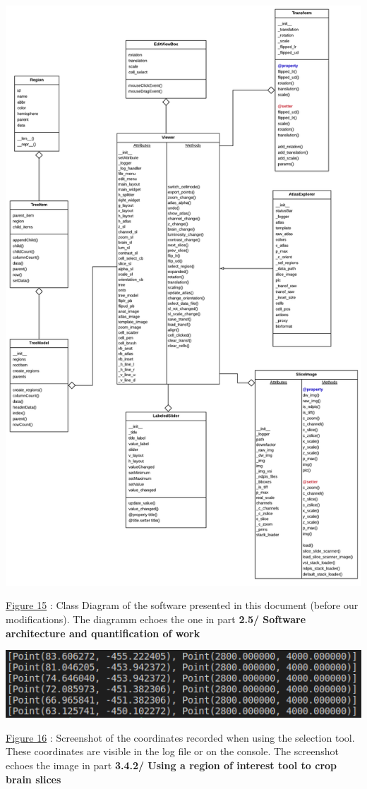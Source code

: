 \documentclass[a4paper,12pt]{report}
\begin{document}
\begin{center} \includegraphics[scale=0.4]{oldArchitecture.png}

\underline{Figure 15} : Class Diagram of the software presented in this document (before our modifications). The diagramm echoes the one in part \textbf{2.5/ Software architecture and quantification of work} \\
\end{center}

\begin{center} \includegraphics[scale=0.6]{coordinatesROI.png}

\underline{Figure 16} : Screenshot of the coordinates recorded when using the selection tool. These coordinates are visible in the log file or on the console. The screenshot echoes the image in part \textbf{3.4.2/ Using a region of interest tool to crop brain slices} \\
\end{center}
\end{document}
